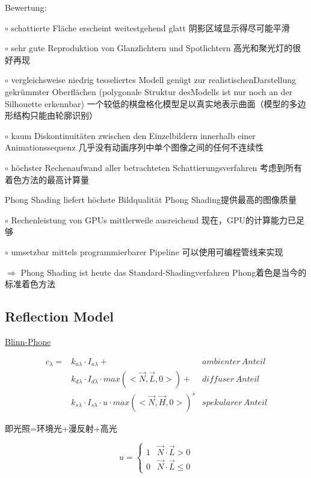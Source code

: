 \documentclass[fleqn]{article}
\begin{document}
Bewertung:

$\circ$ schattierte Fläche erscheint weitestgehend glatt 阴影区域显示得尽可能平滑

$\circ$ sehr gute Reproduktion von Glanzlichtern und Spotlichtern 高光和聚光灯的很好再现

$\circ$ vergleichsweise niedrig tesseliertes Modell genügt zur realistischenDarstellung gekrümmter Oberflächen (polygonale Struktur desModells ist nur noch an der Silhouette erkennbar)
一个较低的棋盘格化模型足以真实地表示曲面（模型的多边形结构只能由轮廓识别）

$\circ$ kaum Diskontinuitäten zwischen den Einzelbildern innerhalb einer Animationssequenz
几乎没有动画序列中单个图像之间的任何不连续性

$\circ$ höchster Rechenaufwand aller betrachteten Schattierungsverfahren 考虑到所有着色方法的最高计算量

Phong Shading liefert höchste Bildqualität Phong Shading提供最高的图像质量

$\circ$ Rechenleistung von GPUs mittlerweile ausreichend 现在，GPU的计算能力已足够

$\circ$ umsetzbar mittels programmierbarer Pipeline 可以使用可编程管线来实现

$\Rightarrow$ Phong Shading ist heute das Standard-Shadingverfahren Phong着色是当今的标准着色方法

\subsection{Reflection Model}

\noindent\underline{Blinn-Phone}

\begin{equation}
    \begin{split}
    c_\lambda=&k_{a\lambda}\cdot I_{a\lambda}+&ambienter\, Anteil\\
    &k_{d\lambda}\cdot I_{d\lambda}\cdot max(<\overrightarrow{N},\overrightarrow{L},0>)+&diffuser\, Anteil\\
    &k_{s\lambda}\cdot I_{s\lambda}\cdot u \cdot max(<\overrightarrow{N},\overrightarrow{H},0>)^s&spekularer\, Anteil
    \end{split}
\end{equation}

即光照=环境光+漫反射+高光

\begin{equation}
    u=\left\{
                \begin{array}{lr}
                1 &  \overrightarrow{N}\cdot\overrightarrow{L} >0\\
                0 &  \overrightarrow{N}\cdot\overrightarrow{L} \leq 0
                \end{array}
    \right.
\end{equation}
\end{document}
